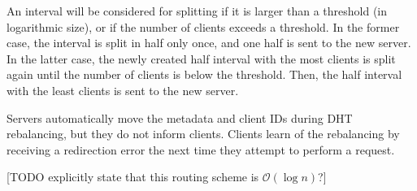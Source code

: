 An interval will be considered for splitting if it is larger than a threshold (in logarithmic size), or if the number of clients exceeds a threshold.
In the former case, the interval is split in half only once, and one half is sent to the new server.
In the latter case, the newly created half interval with the most clients is split again until the number of clients is below the threshold.
Then, the half interval with the least clients is sent to the new server.

Servers automatically move the metadata and client IDs during DHT rebalancing, but they do not inform clients.
Clients learn of the rebalancing by receiving a redirection error the next time they attempt to perform a request.

[TODO explicitly state that this routing scheme is $\mathcal{O}(\log n)$?]